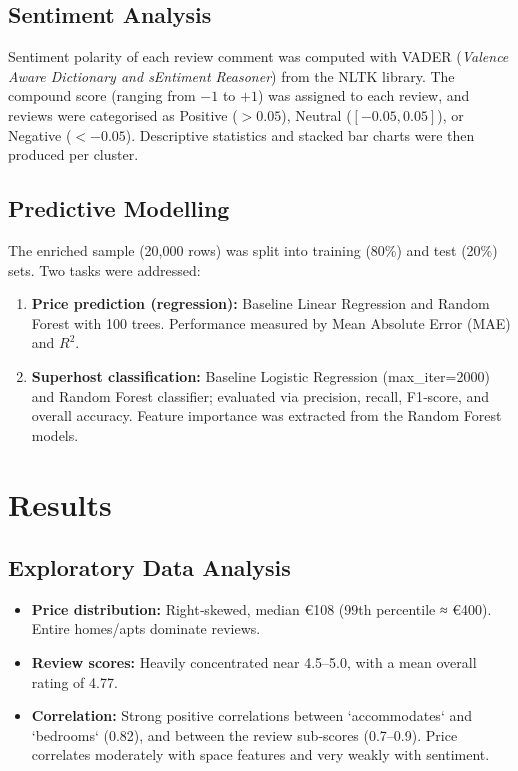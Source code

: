 \documentclass[11pt,a4paper]{article}
\begin{document}
\subsection{Sentiment Analysis}\label{sec:sentiment}
Sentiment polarity of each review comment was computed with VADER (\textit{Valence Aware Dictionary and sEntiment Reasoner}) from the NLTK library. The compound score (ranging from $-1$ to $+1$) was assigned to each review, and reviews were categorised as Positive ($>0.05$), Neutral ($[-0.05,0.05]$), or Negative ($<-0.05$). Descriptive statistics and stacked bar charts were then produced per cluster.

\subsection{Predictive Modelling}
The enriched sample (20,000 rows) was split into training (80\%) and test (20\%) sets. Two tasks were addressed:
\begin{enumerate}[label=(\alph*)]
    \item \textbf{Price prediction (regression):} Baseline Linear Regression and Random Forest with 100 trees. Performance measured by Mean Absolute Error (MAE) and $R^2$.
    \item \textbf{Superhost classification:} Baseline Logistic Regression (max\_iter=2000) and Random Forest classifier; evaluated via precision, recall, F1‑score, and overall accuracy. Feature importance was extracted from the Random Forest models.
\end{enumerate}

\section{Results}
\subsection{Exploratory Data Analysis}
\begin{itemize}
    \item \textbf{Price distribution:} Right‑skewed, median €108 (99th percentile ≈ €400). Entire homes/apts dominate reviews.
    \item \textbf{Review scores:} Heavily concentrated near 4.5–5.0, with a mean overall rating of 4.77.
    \item \textbf{Correlation:} Strong positive correlations between `accommodates` and `bedrooms` (0.82), and between the review sub‑scores (0.7–0.9). Price correlates moderately with space features and very weakly with sentiment.
\end{itemize}
\end{document}
